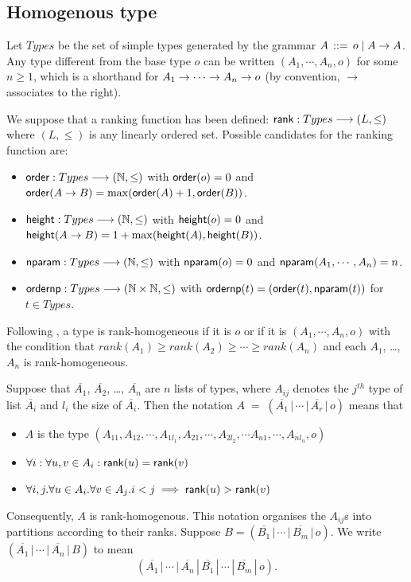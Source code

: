 \subsection{Homogenous type}
\label{sec:homotypes}

Let $Types$ be the set of simple types generated by the grammar $A
\, ::= \, o \; | \; A \rightarrow A$. Any type different from the base
type $o$ can be written $(A_1, \cdots, A_n, o)$ for some $n \geq 1$,
which is a shorthand for $A_1 \rightarrow \cdots \rightarrow A_n \rightarrow o$ (by
convention, $\rightarrow$ associates to the right).

We suppose that a ranking function has been defined: ${\sf rank} :
Types \longrightarrow (L, \leq)$ where $(L, \leq)$ is any linearly ordered
set. Possible candidates for the ranking function are:
\begin{itemize}
\item ${\sf order} : Types \longrightarrow (\mathbb{N},\leq)$ with ${\sf order}(o) = 0$
and ${\sf order}(A \rightarrow B) = \max({\sf order}(A)+1, {\sf order}(B))$.
\item ${\sf height} : Types \longrightarrow (\mathbb{N},\leq)$ with ${\sf height}(o) = 0$
and ${\sf height}(A \rightarrow B) = 1 + \max({\sf height}(A), {\sf height}(B))$.
\item ${\sf nparam} : Types \longrightarrow (\mathbb{N},\leq)$ with ${\sf nparam}(o) = 0$
and ${\sf nparam}(A_1, \cdots, A_n) = n$.
\item ${\sf ordernp} : Types \longrightarrow (\mathbb{N} \times \mathbb{N},\leq)$ with $ {\sf ordernp} (t)  = ({\sf order}(t), {\sf nparam}(t))$ for $t \in Types$.
\end{itemize}


Following \cite{KNU02}, a type is rank-homogeneous if it is $o$ or
if it is $(A_1, \cdots, A_n, o)$ with the condition that $rank(A_1)
\geq rank(A_2)\geq \cdots \geq rank(A_n)$ and each $A_1$, \ldots,
$A_n$ is rank-homogeneous.



Suppose that $\overline{A_1}$, $\overline{A_2}$, \ldots,
$\overline{A_n}$ are $n$ lists of types, where $A_{ij}$ denotes the
$j^{th}$ type of list $\overline{A_i}$ and $l_i$ the size of
$\overline{A_i}$. Then the notation $A \; = \; (\overline{A_1} \, |
\, \cdots \, | \, \overline{A_r} \, | \, o)$ means that
\begin{itemize}
  \item $A$ is the type $(A_{11},A_{12},\cdots, A_{1l_1}, A_{21}, \cdots,A_{2l_2}, \cdots A_{n1},\cdots, A_{nl_n},o)$
  \item $\forall i: \forall u,v \in A_i : {\sf rank}(u) = {\sf rank}(v) $
  \item $\forall i,j . \forall u \in A_i . \forall v \in A_j . i<j \implies {\sf rank}(u) >
   {\sf rank}(v) $
\end{itemize}
Consequently, $A$ is rank-homogenous. This notation organises the
$A_{ij}$s into partitions according to their ranks. Suppose $B =
(\overline{B_1} \, | \, \cdots \, | \, \overline{B_m} \, | \, o)$.
We write $(\overline{A_1} \, | \, \cdots \, | \, \overline{A_n} \, |
\, {B})$ to mean
\[(\overline{A_1} \, | \, \cdots \, | \, \overline{A_n} \, | \,
\overline{B_1} \, | \, \cdots \, | \, \overline{B_m} \, | \, o).\]


